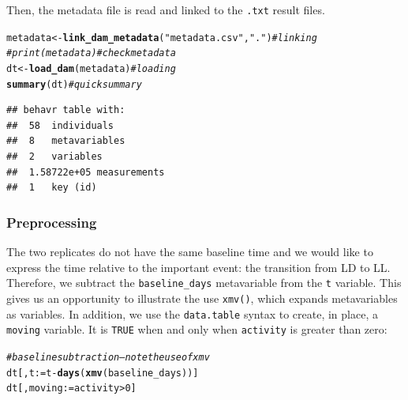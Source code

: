 \documentclass[10pt,letterpaper]{article}\usepackage[]{graphicx}\usepackage[]{color}
\makeatletter
\newcommand{\hlnum}[1]{\textcolor[rgb]{0.686,0.059,0.569}{#1}}%
\newcommand{\hlstr}[1]{\textcolor[rgb]{0.192,0.494,0.8}{#1}}%
\newcommand{\hlcom}[1]{\textcolor[rgb]{0.678,0.584,0.686}{\textit{#1}}}%
\newcommand{\hlopt}[1]{\textcolor[rgb]{0,0,0}{#1}}%
\newcommand{\hlstd}[1]{\textcolor[rgb]{0.345,0.345,0.345}{#1}}%
\newcommand{\hlkwb}[1]{\textcolor[rgb]{0.69,0.353,0.396}{#1}}%
\newcommand{\hlkwd}[1]{\textcolor[rgb]{0.737,0.353,0.396}{\textbf{#1}}}%
\newenvironment{kframe}{%
 \def\at@end@of@kframe{}%
 \ifinner\ifhmode%
  \def\at@end@of@kframe{\end{minipage}}%
  \begin{minipage}{\columnwidth}%
 \fi\fi%
 \def\FrameCommand##1{\hskip\@totalleftmargin \hskip-\fboxsep
 \colorbox{shadecolor}{##1}\hskip-\fboxsep
     \hskip-\linewidth \hskip-\@totalleftmargin \hskip\columnwidth}%
 \MakeFramed {\advance\hsize-\width
   \@totalleftmargin\z@ \linewidth\hsize
   \@setminipage}}%
 {\par\unskip\endMakeFramed%
 \at@end@of@kframe}
\newenvironment{knitrout}{}{} %
\makeatother
\begin{document}
Then, the metadata file is read and linked to the \texttt{.txt} result files.

\begin{knitrout}
\color{fgcolor}\begin{kframe}
\begin{alltt}
\hlstd{metadata} \hlkwb{<-} \hlkwd{link_dam_metadata}\hlstd{(}\hlstr{"metadata.csv"}\hlstd{,} \hlstr{"."}\hlstd{)}   \hlcom{# linking}
\hlcom{# print(metadata)                                     # check metadata}
\hlstd{dt} \hlkwb{<-} \hlkwd{load_dam}\hlstd{(metadata)}                             \hlcom{# loading}
\hlkwd{summary}\hlstd{(dt)}                                           \hlcom{# quick summary}
\end{alltt}
\begin{verbatim}
## behavr table with:
##  58	individuals
##  8	metavariables
##  2	variables
##  1.58722e+05	measurements
##  1	key (id)
\end{verbatim}
\end{kframe}
\end{knitrout}

\subsubsection*{Preprocessing}
The two replicates do not have the same baseline time and we would like to express the time relative to the important event:
the transition from LD to LL. 
Therefore, we subtract the \texttt{baseline\_days} metavariable from the \texttt{t} variable.
This gives us an opportunity to illustrate the use \texttt{xmv()}, which expands metavariables as variables.
In addition, we use the \texttt{data.table} syntax to create, in place, a \texttt{moving} variable.
It is \texttt{TRUE} when and only when \texttt{activity} is greater than zero:

\begin{knitrout}
\color{fgcolor}\begin{kframe}
\begin{alltt}
\hlcom{# baseline subtraction -- note the use of xmv}
\hlstd{dt[,t} \hlkwb{:=} \hlstd{t} \hlopt{-} \hlkwd{days}\hlstd{(}\hlkwd{xmv}\hlstd{(baseline_days))]}
\hlstd{dt[, moving} \hlkwb{:=}  \hlstd{activity} \hlopt{>} \hlnum{0}\hlstd{]}
\end{alltt}
\end{kframe}
\end{knitrout}
\end{document}

